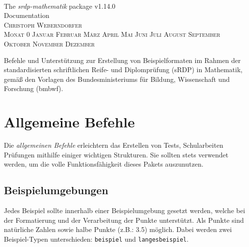 \documentclass[a4paper,12pt]{article}
\makeatletter
\renewcommand*\tableofcontents{\@starttoc{toc}}
\newcommand{\Monat}{%
\ifcase\month
 Monat 0 \or Januar \or Februar \or März  \or April \or Mai \or Juni \or Juli%
 \or August \or September \or Oktober \or November \or Dezember
\fi}
\makeatother
\begin{document}
\begin{titlepage}
\thispagestyle{empty}
\begin{center}
~

\vfill

\Huge The \textit{srdp-mathematik} package v1.14.0\\[1cm]

Documentation \\ [1cm]

\flushright
\textsc{\large Christoph Weberndorfer} \\[-0.5cm]
\textsc{\large \Monat~\the\year} \\ 
\vspace{\baselineskip}

\vfill

\centering
\normalsize 
Befehle und Unterstützung zur Erstellung von Beispielformaten im Rahmen der standardisierten schriftlichen Reife- und Diplomprüfung (sRDP) in Mathematik, gemäß den Vorlagen des Bundesministeriums für Bildung, Wissenschaft und Forschung (bmbwf). 
\vfill 

\begingroup
\let\cleardoublepage\relax
\let\clearpage\relax
\normalsize \tableofcontents
\endgroup

\leer


\end{center}


\end{titlepage}


\section{Allgemeine Befehle}
Die \textit{allgemeinen Befehle} erleichtern das Erstellen von Tests, Schularbeiten Prüfungen mithilfe einiger wichtigen Strukturen. Sie sollten stets verwendet werden, um die volle Funktionsfähigkeit dieses Pakets auszunutzen. 
\vspace{1cm}

\subsection{Beispielumgebungen}

Jedes Beispiel sollte innerhalb einer Beispielumgebung gesetzt werden, welche bei der Formatierung und der Verarbeitung der Punkte unterstützt. Als Punkte sind natürliche Zahlen sowie halbe Punkte (z.B.: 3.5) möglich. Dabei werden zwei Beispiel-Typen unterschieden: \texttt{beispiel} und \texttt{langesbeispiel}.   
\end{document}
